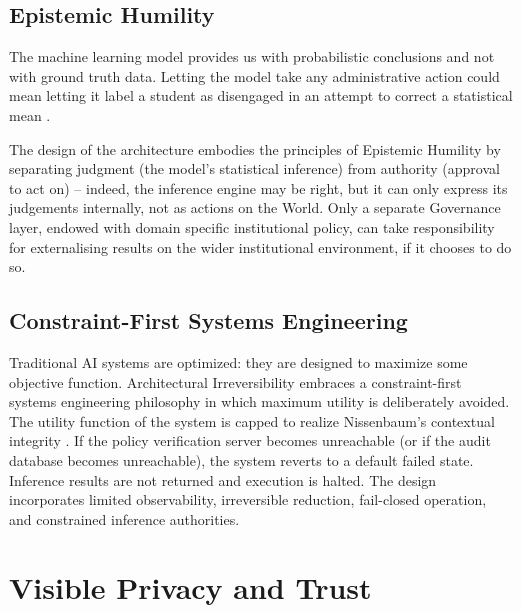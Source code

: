 \documentclass[conference]{IEEEtran}
\begin{document}
\subsection{Epistemic Humility}
The machine learning model provides us with probabilistic conclusions and not with ground truth data. Letting the model take any administrative action could mean letting it label a student as disengaged in an attempt to correct a statistical mean \cite{b13}.

The design of the architecture embodies the principles of Epistemic Humility \cite{b21} by separating judgment (the model's statistical inference) from authority (approval to act on) – indeed, the inference engine may be right, but it can only express its judgements internally, not as actions on the World. Only a separate Governance layer, endowed with domain specific institutional policy, can take responsibility for externalising results on the wider institutional environment, if it chooses to do so.

\subsection{Constraint-First Systems Engineering}
Traditional AI systems are optimized: they are designed to maximize some objective function. Architectural Irreversibility embraces a constraint-first systems engineering philosophy in which maximum utility is deliberately avoided. The utility function of the system is capped to realize Nissenbaum’s contextual integrity \cite{b4}. If the policy verification server becomes unreachable (or if the audit database becomes unreachable), the system reverts to a default failed state. Inference results are not returned and execution is halted. The design incorporates limited observability, irreversible reduction, fail-closed operation, and constrained inference authorities.

\section{Visible Privacy and Trust}
\end{document}
